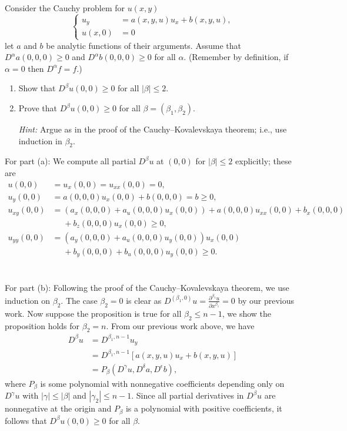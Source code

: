 \begin{problem}
  Consider the Cauchy problem for \(u(x,y)\)
  \[
    \left\{
      \begin{aligned}
        u_y&=a(x, y, u)u_x+b(x,y,u),\\
        u(x,0)&=0
      \end{aligned}
    \right.
  \]
  let \(a\) and \(b\) be analytic functions of their arguments. Assume that
  \(D^\alpha a(0,0,0)\geq 0\) and \(D^\alpha b(0,0,0)\geq 0\) for all
  \(\alpha\). (Remember by definition, if \(\alpha=0\) then
  \(D^\alpha f=f\).)
  \begin{enumerate}[label=(\alph*),noitemsep]
  \item Show that \(D^\beta u(0,0)\geq 0\) for all \(|\beta|\leq 2\).
  \item Prove that \(D^\beta u(0,0)\geq 0\) for all
    \(\beta=(\beta_1,\beta_2)\).

    \noindent \emph{Hint:} Argue as in the proof of the
    Cauchy--Kovalevskaya theorem; i.e., use induction in \(\beta_2\).
  \end{enumerate}
\end{problem}
\begin{solution*}
  For part (a): We compute all partial \(D^\beta u\) at \((0,0)\) for
  \(|\beta|\leq 2\) explicitly; these are
  \begin{align*}
    u(0,0)&=u_x(0,0)=u_{xx}(0,0)=0,\\
    u_y(0,0)&=a(0,0,0)u_x(0,0)+b(0,0,0)=b\geq 0,\\
    u_{xy}(0,0)&=(a_x(0,0,0)+a_u(0,0,0)u_x(0,0))+a(0,0,0)u_{xx}(0,0)+b_x(0,0,0)\\
          &\phantom{{}={}}+b_z(0,0,0)u_x(0,0)\geq 0,\\
    u_{yy}(0,0)&=(a_y(0,0,0)+a_u(0,0,0)u_y(0,0))u_x(0,0)\\
               &\phantom{{}={}}+b_y(0,0,0)+b_u(0,0,0)u_y(0,0)\geq 0.
  \end{align*}
  \\\\
  For part (b): Following the proof of the Cauchy--Kovalevskaya theorem, we
  use induction on \(\beta_2\). The case \(\beta_2=0\) is clear as
  \(D^{(\beta_1,0)}u=\frac{\partial^{\beta_1}u}{\partial x^{\beta_1}}=0\)
  by our previous work. Now suppose the proposition is true for all
  \(\beta_2\leq n-1\), we show the proposition holds for
  \(\beta_2=n\). From our previous work above, we have
  \begin{align*}
    D^\beta u
    &=D^{\beta_1,n-1} u_y\\
    &=D^{\beta_1,n-1}[a(x,y,u)u_x+b(x,y,u)]\\
    &=P_\beta(D^\gamma u,D^\delta a,D^\epsilon b),
  \end{align*}
  where \(P_\beta\) is some polynomial with nonnegative coefficients
  depending only on \(D^\gamma u\) with \(|\gamma|\leq|\beta|\) and
  \(|\gamma_2|\leq n-1\). Since all partial derivatives in \(D^\beta u\)
  are nonnegative at the origin and \(P_\beta\) is a polynomial with
  positive coefficients, it follows that \(D^\beta u(0,0)\geq 0\) for all
  \(\beta\).
\end{solution*}

